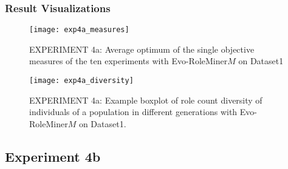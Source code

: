 		\subsubsection{Result Visualizations}
		\label{sec:A_Exp4a_Diagrams}
			\begin{figure}[H]
				\centering
				\texttt{[image: exp4a\_measures]}
				\caption{EXPERIMENT 4a: Average optimum of the single objective measures of the ten experiments with Evo-RoleMiner$M$ on Dataset1}
				\label{fig:exp4a_measures}
			\end{figure}
			\begin{figure}[H]
				\centering
				\texttt{[image: exp4a\_diversity]}
				\caption{EXPERIMENT 4a: Example boxplot of role count diversity of individuals of a population in different generations with Evo-RoleMiner$M$ on Dataset1.}
				\label{fig:exp4a_diversity}
			\end{figure}

	\subsection{Experiment 4b}
	\label{sec:A_Exp4b}
